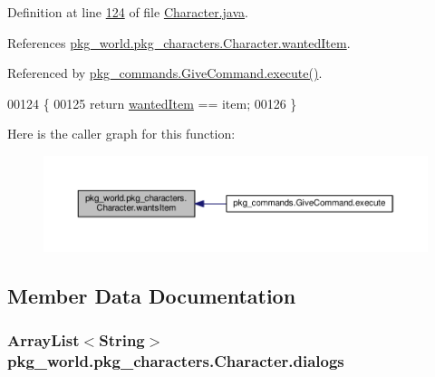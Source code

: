 Definition at line \hyperlink{Character_8java_source_l00124}{124} of file \hyperlink{Character_8java_source}{Character.\-java}.



References \hyperlink{Character_8java_source_l00035}{pkg\-\_\-world.\-pkg\-\_\-characters.\-Character.\-wanted\-Item}.



Referenced by \hyperlink{GiveCommand_8java_source_l00029}{pkg\-\_\-commands.\-Give\-Command.\-execute()}.


\begin{DoxyCode}
00124                                         \{
00125         \textcolor{keywordflow}{return} \hyperlink{classpkg__world_1_1pkg__characters_1_1Character_a3e5abf14759d18446163db9597d10a44}{wantedItem} == item;
00126     \}
\end{DoxyCode}


Here is the caller graph for this function\-:
\nopagebreak
\begin{figure}[H]
\begin{center}
\leavevmode
\includegraphics[width=350pt]{classpkg__world_1_1pkg__characters_1_1Character_a816f8f79ef1e8c9635f0cdeb180b9f3f_icgraph}
\end{center}
\end{figure}




\subsection{Member Data Documentation}
\hypertarget{classpkg__world_1_1pkg__characters_1_1Character_a4747943f9a5d0f11605230df4d2559d2}{
\subsubsection[{dialogs}]{\setlength{\rightskip}{0pt plus 5cm}Array\-List$<$String$>$ pkg\-\_\-world.\-pkg\-\_\-characters.\-Character.\-dialogs\hspace{0.3cm}{\ttfamily [private]}}}\label{classpkg__world_1_1pkg__characters_1_1Character_a4747943f9a5d0f11605230df4d2559d2}


